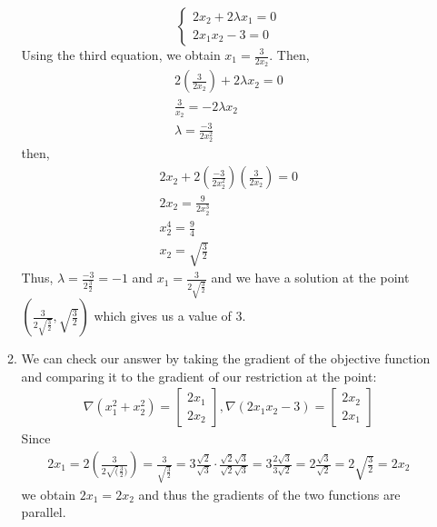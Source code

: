 \documentclass[12pt,english]{article}
\begin{document}
\begin{enumerate}
\begin{enumerate}
\[\begin{cases}
            2x_2 + 2\lambda x_1 = 0 \\
            2x_1x_2-3 = 0
        \end{cases}
        \]
        Using the third equation, we obtain $x_1 = \frac{3}{2x_2}$. Then, 
        \begin{gather*}
            2(\frac{3}{2x_2}) + 2\lambda x_2 = 0\\
            \frac{3}{x_2} = -2\lambda x_2\\
            \lambda = \frac{-3}{2x_2^2}
        \end{gather*}
        then,
        \begin{gather*}
            2x_2 + 2(\frac{-3}{2x_2^2})(\frac{3}{2x_2}) = 0\\
            2x_2 = \frac{9}{2x_2^3}\\
            x_2^4 = \frac{9}{4}\\
            x_2 = \sqrt{\frac{3}{2}}
        \end{gather*}
        Thus, $\lambda = \frac{-3}{2\frac{3}{2}} = -1$ and 
        $x_1 = \frac{3}{2\sqrt{\frac{3}{2}}}$ and we have a solution at the point
        $(\frac{3}{2\sqrt{\frac{3}{2}}}, \sqrt{\frac{3}{2}})$ which gives us a value
        of $3$. 
        \item 
        We can check our answer by taking the gradient of the objective function 
        and comparing it to the gradient of our restriction at the point: 
        \begin{gather*}
            \nabla (x_1^2 + x_2^2) = 
            \begin{bmatrix}
                2x_1\\
                2x_2
            \end{bmatrix}, 
            \nabla (2x_1x_2 - 3) = 
            \begin{bmatrix}
                2x_2 \\
                2x_1
            \end{bmatrix}
        \end{gather*}
        Since
        \begin{gather*}
            2x_1 = 2\left(\frac{3}{2\sqrt(\frac{3}{2})}\right) = \frac{3}{\sqrt{\frac{3}{2}}} = 
            3\frac{\sqrt{2}}{\sqrt{3}}\cdot \frac{\sqrt{2}\sqrt{3}}{\sqrt{2}\sqrt{3}} = 
            3\frac{2\sqrt{3}}{3\sqrt{2}} = 2\frac{\sqrt{3}}{\sqrt{2}} = 2\sqrt{\frac{3}{2}} = 2x_2
        \end{gather*}
        we obtain $2x_1 = 2x_2$ and thus the gradients of the two functions are parallel. 

\end{enumerate}
\end{enumerate}
\end{document}
